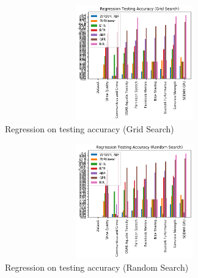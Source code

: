 \documentclass[10pt,twocolumn,letterpaper]{article}
\begin{document}
\begin{figure}
   \begin{center}
   \includegraphics[width=15cm,height=5cm,keepaspectratio]{Regression Testing Accuracy (Grid Search).png}
   \end{center}
      \caption{Regression on testing accuracy (Grid Search)\label{Regression testing accuracy}}
\end{figure}

\begin{figure}
   \begin{center}
   \includegraphics[width=15cm,height=5cm,keepaspectratio]{Regression Testing Accuracy (Random Search).png}
   \end{center}
      \caption{Regression on testing accuracy (Random Search)\label{Regression testing accuracy}}
\end{figure}
\newpage

\appendix



\end{document}
